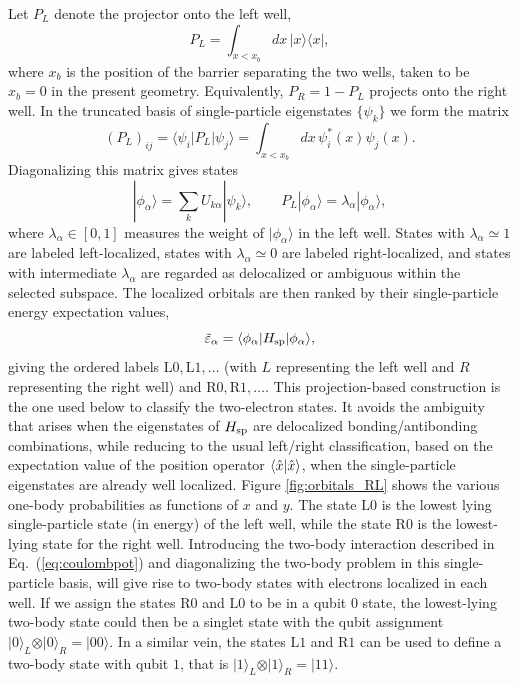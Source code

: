 \documentclass[fleqn,10pt]{wlscirep}
\begin{document}
Let $P_L$ denote the projector onto the left well,
\begin{equation}
  P_L = \int_{x<x_b} dx\, |x\rangle\langle x|,
\end{equation}
where $x_b$ is the position of the barrier separating the two wells, taken to be $x_b=0$ in the present geometry.  Equivalently, $P_R=1-P_L$ projects onto the right well.  In the truncated basis of single-particle eigenstates $\{\psi_k\}$ we form the matrix
\begin{equation}
  (P_L)_{ij}
  =
  \langle \psi_i | P_L | \psi_j\rangle
  =
  \int_{x<x_b} dx\, \psi_i^*(x)\psi_j(x).
\end{equation}
Diagonalizing this matrix gives states
\begin{equation}
  |\phi_\alpha\rangle
  =
  \sum_k U_{k\alpha} |\psi_k\rangle,
  \qquad
  P_L|\phi_\alpha\rangle
  =
  \lambda_\alpha |\phi_\alpha\rangle ,
\end{equation}
where $\lambda_\alpha\in[0,1]$ measures the weight of $|\phi_\alpha\rangle$ in the left well.  States with $\lambda_\alpha\simeq 1$ are labeled left-localized, states with $\lambda_\alpha\simeq 0$ are labeled right-localized, and states with intermediate $\lambda_\alpha$ are regarded as delocalized or ambiguous within the selected subspace.
The localized orbitals are then ranked by their single-particle energy expectation
values,
\begin{equation}
  \tilde{\varepsilon}_\alpha
  =
  \langle \phi_\alpha | H_{\rm sp} | \phi_\alpha\rangle ,
\end{equation}
giving the ordered labels $\mathrm{L0},\mathrm{L1},\dots$ (with $L$ representing the left well and $R$ representing the right well) and
$\mathrm{R0},\mathrm{R1},\dots$.  This projection-based construction is the one used below to classify the two-electron states.  It avoids the ambiguity that arises when the eigenstates of $H_{\rm sp}$ are delocalized bonding/antibonding combinations, while reducing to the usual left/right classification, based on the expectation value of the position operator $\braket{\hat{x}}$, when the single-particle eigenstates are already well localized. 
Figure \ref{fig:orbitals_RL} shows the various  one-body probabilities as functions of $x$ and $y$. The state $\mathrm{L0}$ is the lowest lying single-particle state (in energy) of the left well, while the state $\mathrm{R0}$ is the lowest-lying state for the right well. Introducing the two-body interaction described in Eq.~(\ref{eq:coulombpot}) and diagonalizing the two-body problem in this single-particle basis, will give rise to two-body states with electrons localized in each well. If we assign the states $\mathrm{R0}$ and $\mathrm{L0}$ to be in a qubit $0$ state, the lowest-lying two-body state could then be a singlet state with the qubit assignment $\vert 0\rangle_L \otimes \vert 0\rangle_R=\vert 00\rangle$. In a similar vein, the states $\mathrm{L1}$ and $\mathrm{R1}$ can be used to define a two-body state with qubit $1$, that is $\vert 1\rangle_L \otimes \vert 1\rangle_R=\vert 11\rangle$.
\end{document}
